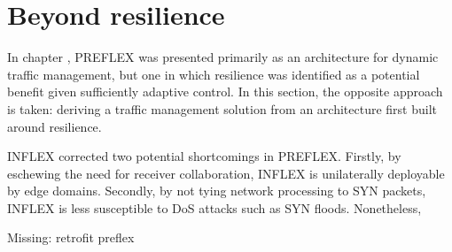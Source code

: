 \section{Beyond resilience}

In chapter \label{chapter:preflex}, \ac{PREFLEX} was presented primarily as an architecture for dynamic traffic management, but one in which resilience was identified as a potential benefit given sufficiently adaptive control.
In this section, the opposite approach is taken: deriving a traffic management solution from an architecture first built around resilience.

INFLEX corrected two potential shortcomings in PREFLEX.
Firstly, by eschewing the need for receiver collaboration, INFLEX is unilaterally deployable by edge domains.
Secondly, by not tying network processing to SYN packets, INFLEX is less susceptible to \ac{DoS} attacks such as SYN floods.
Nonetheless, 

{\COMMENT Missing: retrofit preflex}

